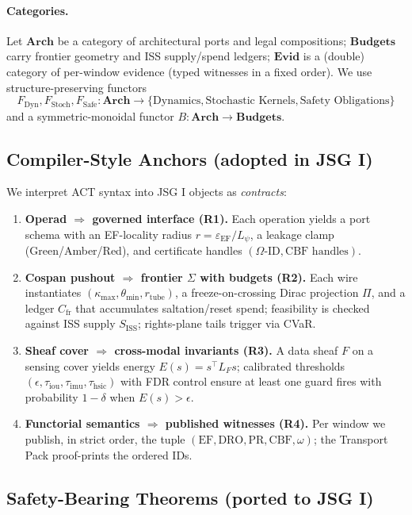\documentclass[10pt]{article}
\begin{document}
\paragraph{Categories.}
Let $\mathbf{Arch}$ be a category of architectural ports and legal compositions; $\mathbf{Budgets}$ carry frontier geometry and ISS supply/spend ledgers; $\mathbf{Evid}$ is a (double) category of per-window evidence (typed witnesses in a fixed order). We use structure-preserving functors
\[
F_{\mathrm{Dyn}},F_{\mathrm{Stoch}},F_{\mathrm{Safe}}:\mathbf{Arch}\to\{\text{Dynamics},\text{Stochastic Kernels},\text{Safety Obligations}\}
\]
and a symmetric-monoidal functor $B:\mathbf{Arch}\to\mathbf{Budgets}$.

\subsection{Compiler-Style Anchors (adopted in JSG I)}
We interpret ACT syntax into JSG I objects as \emph{contracts}:
\begin{enumerate}
  \item \textbf{Operad $\Rightarrow$ governed interface (R1).} Each operation yields a port schema with an EF-locality radius $r=\varepsilon_{\mathrm{EF}}/L_\psi$, a leakage clamp (Green/Amber/Red), and certificate handles $(\Omega\text{-ID},\text{CBF handles})$.
  \item \textbf{Cospan pushout $\Rightarrow$ frontier $\Sigma$ with budgets (R2).} Each wire instantiates $(\kappa_{\max},\theta_{\min},r_{\mathrm{tube}})$, a freeze-on-crossing Dirac projection $\Pi$, and a ledger $C_{\mathrm{fr}}$ that accumulates saltation/reset spend; feasibility is checked against ISS supply $S_{\mathrm{ISS}}$; rights-plane tails trigger via CVaR.
  \item \textbf{Sheaf cover $\Rightarrow$ cross-modal invariants (R3).} A data sheaf $F$ on a sensing cover yields energy $E(s)=s^\top L_F s$; calibrated thresholds $(\epsilon,\tau_{\mathrm{iou}},\tau_{\mathrm{imu}},\tau_{\mathrm{hsic}})$ with FDR control ensure at least one guard fires with probability $1-\delta$ when $E(s)>\epsilon$.
  \item \textbf{Functorial semantics $\Rightarrow$ published witnesses (R4).} Per window we publish, in strict order, the tuple $(\text{EF},\text{DRO},\text{PR},\text{CBF},\omega)$; the Transport Pack proof-prints the ordered IDs.
\end{enumerate}

\subsection{Safety-Bearing Theorems (ported to JSG I)}
\end{document}
